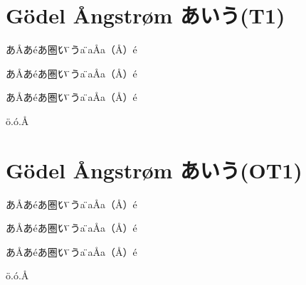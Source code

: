\documentclass{jarticle}
\def\test{あ\AA あ\'eあ\'圏い\"圏うa\"圏a\AA a（\AA）\'e}
\begin{document}
\sloppy
{}\selectfont
\section{G\"odel \AA ngstr\o m あいう(T1)}
\test\par
{}
\test

\test

\edef\XA{\"o.\'o.\AA}
{\ttfamily\meaning\XA}


\selectfont
\section{G\"odel \AA ngstr\o m あいう(OT1)}
\test\par
{}
\test

\test

\edef\XA{\"o.\'o.\AA}
{\ttfamily \meaning\XA}
\end{document}
